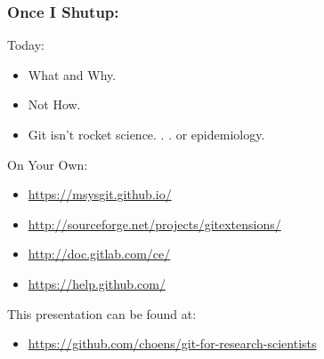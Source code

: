 \documentclass{beamer}
\begin{document}
\begin{frame} %
  \frametitle{Once I Shutup:}

  Today:
  \begin{itemize}
  \item What and Why.
  \item Not How.
  \item Git isn't rocket science. . . or epidemiology.
  \end{itemize}

  \bigskip
  On Your Own:
  \begin{itemize}
  \item {\url{https://msysgit.github.io/}}
  \item {\url{http://sourceforge.net/projects/gitextensions/}}
  \item {\url{http://doc.gitlab.com/ce/}}
  \item {\url{https://help.github.com/}}
  \end{itemize}

  \bigskip
  This presentation can be found at:
  \begin{itemize}
  \item {\small{\url{https://github.com/choens/git-for-research-scientists}}}
  \end{itemize}
  
\end{frame}
\end{document}
